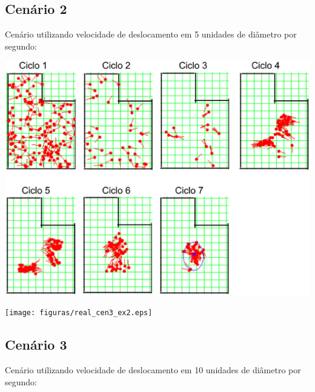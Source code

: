 \subsection{Cenário 2}

Cenário utilizando velocidade de deslocamento em 5 unidades de diâmetro por segundo:

{\centering
\includegraphics[scale=0.4]{figuras/cen3_ex2.eps}
\label{img:cen3_ex2}
\par}

{\centering
\texttt{[image: figuras/real\_cen3\_ex2.eps]}
\label{img:real_cen3_ex2}
\par}


\subsection{Cenário 3}

Cenário utilizando velocidade de deslocamento em 10 unidades de diâmetro por segundo:

